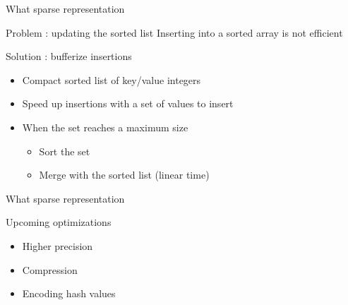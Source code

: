 \documentclass{beamer}
\begin{document}
\begin{frame}{What sparse representation}


  \begin{alertblock}{Problem : updating the sorted list}
    Inserting into a sorted array is not efficient
  \end{alertblock}

  \begin{block}{Solution : bufferize insertions}
    \begin{itemize}
      \item Compact sorted list of key/value integers
      \item Speed up insertions with a set of values to insert
      \item When the set reaches a maximum size
      \begin{itemize}
        \item Sort the set
        \item Merge with the sorted list (linear time)
      \end{itemize}
    \end{itemize}
  \end{block}

\end{frame}


\begin{frame}{What sparse representation}

  \begin{block}{Upcoming optimizations}
    \begin{itemize}
      \item Higher precision
      \item Compression
      \item Encoding hash values
    \end{itemize}
  \end{block}

\end{frame}


\end{document}
